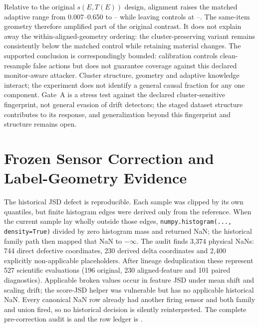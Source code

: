 \documentclass[10pt,journal,compsoc]{IEEEtran}
\begin{document}
Relative to the original $s(E,T(E))$ design, alignment raises the matched
adaptive range from 0.007--0.650 to \GeoGateAdaptiveMatchedMin--\GeoGateAdaptiveMatchedMax{} while leaving controls at
\GeoGateControlMatchedMin--\GeoGateControlMatchedMax{}. The same-item geometry therefore amplified part of the original
contrast. It does not explain away the within-aligned-geometry ordering: the
cluster-preserving variant remains consistently below the matched control
while retaining material changes. The supported conclusion is correspondingly
bounded: calibration controls clean-resample false actions but does not
guarantee coverage against this declared monitor-aware attacker. Cluster
structure, geometry and adaptive knowledge interact; the experiment does not
identify a general causal fraction for any one component. Gate~A is a stress
test against the declared cluster-sensitive fingerprint, not general evasion
of drift detectors; the staged dataset structure contributes to its response,
and generalization beyond this fingerprint and structure remains open.

\FloatBarrier

\section{Frozen Sensor Correction and Label-Geometry Evidence}
\label{sec:v137-closure}

The historical JSD defect is reproducible. Each sample was clipped by its own
quantiles, but finite histogram edges were derived only from the reference.
When the current sample lay wholly outside those edges,
\texttt{numpy.histogram(..., density=True)} divided by zero histogram mass and
returned NaN; the historical family path then mapped that NaN to $-\infty$.
The audit finds 3,374 physical NaNs: 744 direct defective coordinates, 230
derived delta coordinates and 2,400 explicitly non-applicable placeholders.
After lineage deduplication these represent 527 scientific evaluations (196
original, 230 aligned-feature and 101 paired diagnostics). Applicable broken
values occur in feature JSD under mean shift and scaling drift; the score-JSD
helper was vulnerable but has no applicable historical NaN. Every canonical
NaN row already had another firing sensor and both family and union fired, so
no historical decision is silently reinterpreted. The complete pre-correction
audit is  and the row ledger is
.
\end{document}
